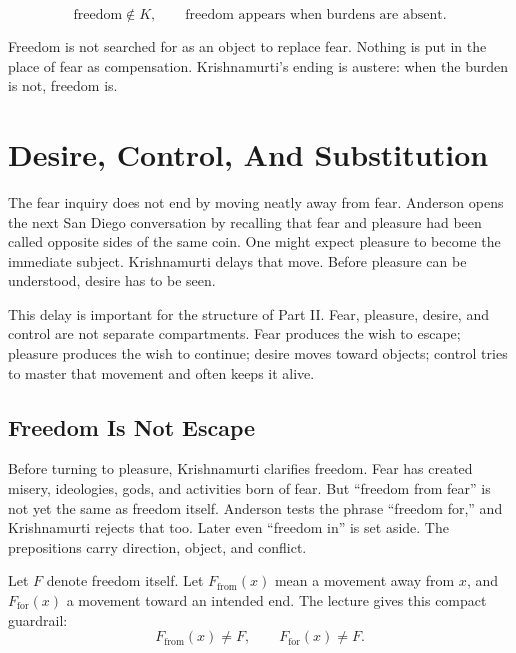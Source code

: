 \documentclass[11pt,oneside]{book}
\begin{document}
\begin{equation}
\text{freedom} \notin K,
\qquad
\text{freedom appears when burdens are absent}.
\end{equation}

Freedom is not searched for as an object to replace fear. Nothing is put in the place of fear as compensation. Krishnamurti's ending is austere: when the burden is not, freedom is.


\chapter{Desire, Control, And Substitution}

The fear inquiry does not end by moving neatly away from fear. Anderson opens the next San Diego conversation by recalling that fear and pleasure had been called opposite sides of the same coin. One might expect pleasure to become the immediate subject. Krishnamurti delays that move. Before pleasure can be understood, desire has to be seen.

This delay is important for the structure of Part II. Fear, pleasure, desire, and control are not separate compartments. Fear produces the wish to escape; pleasure produces the wish to continue; desire moves toward objects; control tries to master that movement and often keeps it alive.

\section{Freedom Is Not Escape}

Before turning to pleasure, Krishnamurti clarifies freedom. Fear has created misery, ideologies, gods, and activities born of fear. But ``freedom from fear'' is not yet the same as freedom itself. Anderson tests the phrase ``freedom for,'' and Krishnamurti rejects that too. Later even ``freedom in'' is set aside. The prepositions carry direction, object, and conflict.

Let \(F\) denote freedom itself. Let \(F_{\mathrm{from}}(x)\) mean a movement away from \(x\), and \(F_{\mathrm{for}}(x)\) a movement toward an intended end. The lecture gives this compact guardrail:
\begin{equation}
F_{\mathrm{from}}(x) \neq F,
\qquad
F_{\mathrm{for}}(x) \neq F.
\end{equation}
\end{document}

